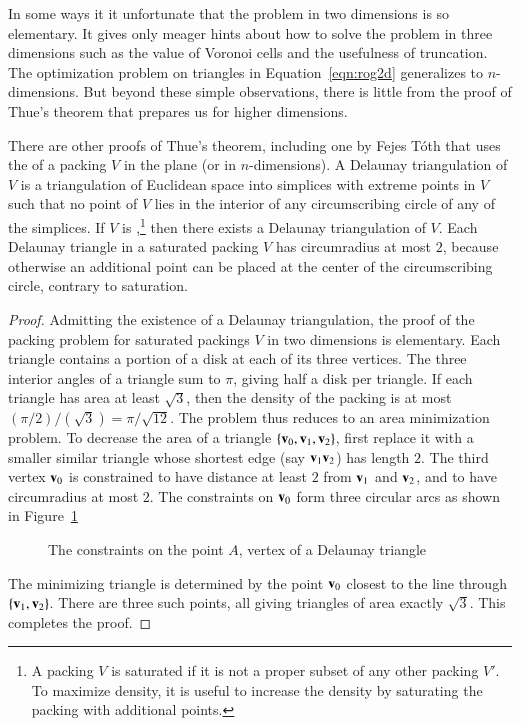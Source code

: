 In some ways it it unfortunate that the problem in two dimensions is
so elementary.  It gives only meager hints about how to solve the problem
in three dimensions such as the value of Voronoi cells
and the usefulness of truncation.  The optimization problem on
triangles in Equation~\ref{eqn:rog2d} generalizes to $n$-dimensions.
But beyond these simple observations, there is little from the proof of Thue's
theorem that prepares us for higher dimensions.


\bigskip

There are other proofs of Thue's theorem, including one by Fejes
T\'oth that uses the  of a packing $V$
in the plane (or in $n$-dimensions).  A Delaunay triangulation of $V$
is a triangulation of Euclidean space into simplices with extreme
points in $V$ such that no point of $V$ lies in the interior of any
circumscribing circle of any of the simplices.  If $V$ is
,\footnote{A packing $V$ is saturated if it is not
  a proper subset of any other packing $V'$.  To maximize density, it
  is useful to increase the density by saturating the packing with
  additional points.} then there exists a Delaunay triangulation of
$V$.  Each Delaunay triangle in a saturated packing $V$ has
circumradius at most $2$, because otherwise an additional point can be
placed at the center of the circumscribing circle, contrary to saturation.

\begin{proof}
  Admitting the existence of a Delaunay triangulation, the proof of
  the packing problem for saturated packings $V$ in two dimensions is
  elementary.  Each triangle contains a portion of a disk at each of
  its three vertices.  The three interior angles of a triangle sum to
  $\pi$, giving half a disk per triangle.  If each triangle has area
  at least $\sqrt{3}$, then the density of the packing is at most
  $(\pi/2)/(\sqrt{3}) = \pi/\sqrt{12}$.  The problem thus reduces to
  an area minimization problem.  To decrease the area of a triangle
  $\{{\mathbf v}_0,{\mathbf v}_1,{\mathbf v}_2\}$, first replace it with a smaller similar
  triangle whose shortest edge (say ${\mathbf v}_1{\mathbf v}_2$) has length $2$.  The
  third vertex ${\mathbf v}_0$ is constrained to have distance at least $2$
  from ${\mathbf v}_1$ and ${\mathbf v}_2$, and to have circumradius at most $2$.  The
  constraints on ${\mathbf v}_0$ form three circular arcs as shown in
  Figure~\ref{fig:2D-FT} %

\begin{figure}[htb]
  \centering
  \caption{The constraints on the point $A$, vertex of a Delaunay triangle}
  \label{fig:2D-FT}
\end{figure}

The minimizing triangle is determined by the point ${\mathbf v}_0$ closest to
the line through $\{{\mathbf v}_1,{\mathbf v}_2\}$.  There are three such points, all giving
triangles of area exactly $\sqrt3$.  This completes the proof.
\end{proof}

